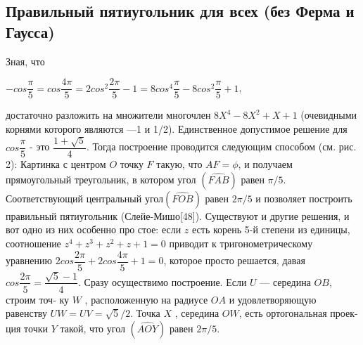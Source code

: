 \documentclass{mai_book}
\begin{document}
\subsection{Правильный пятиугольник для всех (без Ферма и Гаусса)}
\hspace*{15pt}Зная, что
\begin{center}
$-cos\dfrac{\pi}{5}=cos\dfrac{4\pi}{5}=2cos^2\dfrac{2\pi}{5}-1=8cos^4\dfrac{\pi}{5}-8cos^2\dfrac{\pi}{5}+1$,
\end{center}
достаточно разложить на множители многочлен $8X^4-8X^2+X+1$
(очевидными корнями которого являются —1 и 1/2). Единственное допустимое решение для $cos\dfrac{\pi}{5}$ - это $\dfrac{1+\sqrt{5}}{4}$. Тогда построение проводится
следующим способом (см. рис. 2):\newline
Картинка
с центром $O$ точку $F$ такую, что $AF=\phi$, и получаем прямоугольный
треугольник, в котором угол $(\widehat{FAB})$ равен $\pi/5$.
Соответствующий центральный угол$(\widehat{FOB})$ равен $2\pi/5$ и позволяет
построить правильный пятиугольник (Слейе-Мишо[48]).
Существуют и другие решения, и вот одно из них особенно про
стое: если $z$ есть корень 5-й степени из единицы, соотношение $z^4+z^3+z^2+z+1=0$ приводит к тригонометрическому уравнению
$2cos\dfrac{2\pi}{5}+2cos\dfrac{4\pi}{5}+1=0$, которое просто решается, давая $cos\dfrac{2\pi}{5}=\dfrac{\sqrt{5}-1}{4}$.
Сразу осуществимо построение. Если $U$ — середина $OB$, строим точ-
ку $W$ , расположенную на радиусе $OA$ и удовлетворяющую равенству
$UW=UV=\sqrt{5}/2$. Точка $X$ , середина $OW$, есть ортогональная проек-
ция точки $Y$ такой, что угол $(\widehat{AOY})$ равен $2\pi/5$.
\end{document}
